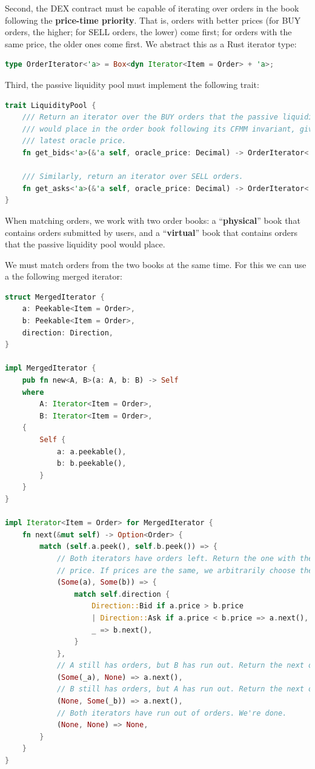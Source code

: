 \documentclass{article}
\begin{document}
Second, the DEX contract must be capable of iterating over orders in the book following the \textbf{price-time priority}. That is, orders with better prices (for BUY orders, the higher; for SELL orders, the lower) come first; for orders with the same price, the older ones come first. We abstract this as a Rust iterator type:

\begin{lstlisting}[language=rust]
type OrderIterator<'a> = Box<dyn Iterator<Item = Order> + 'a>;
\end{lstlisting}

Third, the passive liquidity pool must implement the following trait:

\begin{lstlisting}[language=rust]
trait LiquidityPool {
    /// Return an iterator over the BUY orders that the passive liquidity pool
    /// would place in the order book following its CFMM invariant, given the
    /// latest oracle price.
    fn get_bids<'a>(&'a self, oracle_price: Decimal) -> OrderIterator<'a>;

    /// Similarly, return an iterator over SELL orders.
    fn get_asks<'a>(&'a self, oracle_price: Decimal) -> OrderIterator<'a>;
}
\end{lstlisting}

When matching orders, we work with two order books: a ``\textbf{physical}'' book that contains orders submitted by users, and a ``\textbf{virtual}'' book that contains orders that the passive liquidity pool would place.

We must match orders from the two books at the same time. For this we can use a the following merged iterator:

\begin{lstlisting}[language=rust]
struct MergedIterator {
    a: Peekable<Item = Order>,
    b: Peekable<Item = Order>,
    direction: Direction,
}

impl MergedIterator {
    pub fn new<A, B>(a: A, b: B) -> Self
    where
        A: Iterator<Item = Order>,
        B: Iterator<Item = Order>,
    {
        Self {
            a: a.peekable(),
            b: b.peekable(),
        }
    }
}

impl Iterator<Item = Order> for MergedIterator {
    fn next(&mut self) -> Option<Order> {
        match (self.a.peek(), self.b.peek()) => {
            // Both iterators have orders left. Return the one with the better
            // price. If prices are the same, we arbitrarily choose the order in B.
            (Some(a), Some(b)) => {
                match self.direction {
                    Direction::Bid if a.price > b.price
                    | Direction::Ask if a.price < b.price => a.next(),
                    _ => b.next(),
                }
            },
            // A still has orders, but B has run out. Return the next order in A.
            (Some(_a), None) => a.next(),
            // B still has orders, but A has run out. Return the next order in B.
            (None, Some(_b)) => a.next(),
            // Both iterators have run out of orders. We're done.
            (None, None) => None,
        }
    }
}
\end{lstlisting}
\end{document}
